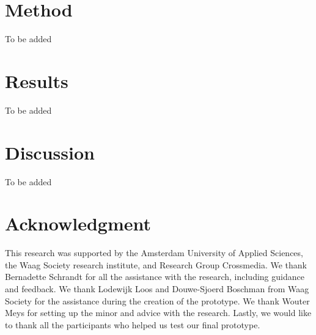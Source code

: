 \documentclass[sigconf]{acmart}
\begin{document}

\section{Method}
To be added


\section{Results}
To be added


\section{Discussion}
To be added


\section{Acknowledgment}
This research was supported by the Amsterdam University of Applied Sciences, the Waag Society research
institute, and Research Group Crossmedia. We thank Bernadette Schrandt for all the assistance
with the research, including guidance and feedback. We thank Lodewijk Loos and Douwe-Sjoerd Boschman 
from Waag Society for the assistance during the creation of the prototype. We thank Wouter Meys for setting
up the minor and advice with the research. Lastly, we would like to thank all the participants who helped
us test our final prototype.





\end{document}
